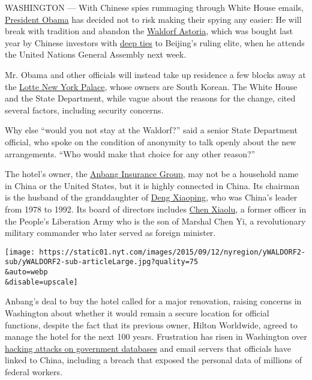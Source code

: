 WASHINGTON --- With Chinese spies rummaging through White House emails,
\href{http://topics.nytimes.com/top/reference/timestopics/people/o/barack_obama/index.html?inline=nyt-per}{President
Obama} has decided not to risk making their spying any easier: He will
break with tradition and abandon the
\href{http://waldorfastoria3.hilton.com/en/hotels/new-york/waldorf-astoria-new-york-NYCWAWA/index.html}{Waldorf
Astoria}, which was bought last year by Chinese investors with
\href{http://dealbook.nytimes.com/2014/10/08/chinese-return-to-the-waldorf-with-2-billion/}{deep
ties} to Beijing's ruling elite, when he attends the United Nations
General Assembly next week.

Mr. Obama and other officials will instead take up residence a few
blocks away at the
\href{http://www.lottenypalace.com/?chebs=gl-thenewyorkpalace}{Lotte New
York Palace}, whose owners are South Korean. The White House and the
State Department, while vague about the reasons for the change, cited
several factors, including security concerns.

Why else ``would you not stay at the Waldorf?'' said a senior State
Department official, who spoke on the condition of anonymity to talk
openly about the new arrangements. ``Who would make that choice for any
other reason?''

The hotel's owner, the
\href{http://fortune.com/2014/10/07/who-is-anbang-insurance-the-new-owner-of-new-yorks-waldorf-astoria/}{Anbang
Insurance Group,} may not be a household name in China or the United
States, but it is highly connected in China. Its chairman is the husband
of the granddaughter of
\href{http://topics.nytimes.com/top/reference/timestopics/people/d/deng_xiaoping/index.html?8qa}{Deng
Xiaoping}, who was China's leader from 1978 to 1992. Its board of
directors includes
\href{http://www.nytimes.com/2013/12/07/world/asia/a-student-leader-in-maos-cultural-revolution.html}{Chen
Xiaolu}, a former officer in the People's Liberation Army who is the son
of Marshal Chen Yi, a revolutionary military commander who later served
as foreign minister.

\texttt{[image: https://static01.nyt.com/images/2015/09/12/nyregion/yWALDORF2-sub/yWALDORF2-sub-articleLarge.jpg?quality=75\\\&auto=webp\\\&disable=upscale]}

Anbang's deal to buy the hotel called for a major renovation, raising
concerns in Washington about whether it would remain a secure location
for official functions, despite the fact that its previous owner, Hilton
Worldwide, agreed to manage the hotel for the next 100 years.
Frustration has risen in Washington over
\href{http://www.nytimes.com/2015/06/21/us/attack-gave-chinese-hackers-privileged-access-to-us-systems.html}{hacking
attacks on government databases} and email servers that officials have
linked to China, including a breach that exposed the personal data of
millions of federal workers.

